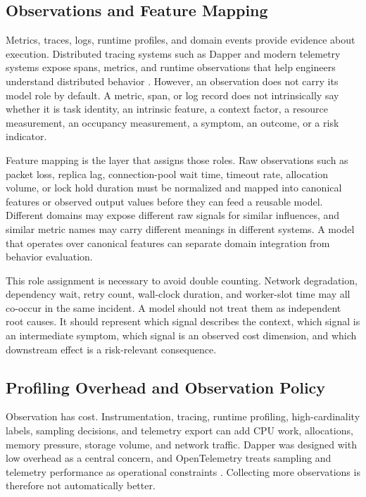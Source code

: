\subsection{Observations and Feature Mapping}
\label{sec:background-observability-feature-mapping}

Metrics, traces, logs, runtime profiles, and domain events provide evidence
about execution. Distributed tracing systems such as Dapper and modern telemetry
systems expose spans, metrics, and runtime observations that help engineers
understand distributed behavior
\cite{sigelman2010dapper,opentelemetryMetricsDataModel}. However, an observation
does not carry its model role by default. A metric, span, or log record does not
intrinsically say whether it is task identity, an intrinsic feature, a context
factor, a resource measurement, an occupancy measurement, a symptom, an outcome,
or a risk indicator.

Feature mapping is the layer that assigns those roles. Raw observations such as
packet loss, replica lag, connection-pool wait time, timeout rate, allocation
volume, or lock hold duration must be normalized and mapped into canonical
features or observed output values before they can feed a reusable model.
Different domains may expose different raw signals for similar influences, and
similar metric names may carry different meanings in different systems. A model
that operates over canonical features can separate domain integration from
behavior evaluation.

This role assignment is necessary to avoid double counting. Network degradation,
dependency wait, retry count, wall-clock duration, and worker-slot time may all
co-occur in the same incident. A model should not treat them as independent root
causes. It should represent which signal describes the context, which signal is
an intermediate symptom, which signal is an observed cost dimension, and which
downstream effect is a risk-relevant consequence.

\subsection{Profiling Overhead and Observation Policy}
\label{sec:background-profiling-overhead}

Observation has cost. Instrumentation, tracing, runtime profiling,
high-cardinality labels, sampling decisions, and telemetry export can add CPU
work, allocations, memory pressure, storage volume, and network traffic. Dapper
was designed with low overhead as a central concern, and OpenTelemetry treats
sampling and telemetry performance as operational constraints
\cite{sigelman2010dapper,opentelemetrySampling,opentelemetryPerformance}.
Collecting more observations is therefore not automatically better.

